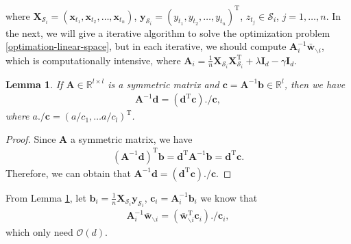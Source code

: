 \documentclass{article}
\newtheorem{lemma}{Lemma}
\begin{document}
where $\mathbf X_{\mathcal{S}_i}=(\mathbf x_{t_1},\mathbf x_{t_2},\ldots, \mathbf x_{t_n})$,
$\mathbf y_{\mathcal{S}_i}=(y_{t_1},y_{t_2},\ldots,y_{t_n})^\mathrm{T}$, $z_{t_j}\in \mathcal{S}_i$, $j=1,\ldots, n$.
In the next, we will give a iterative algorithm to
solve the optimization problem \ref{optimation-linear-space},
but in each iterative, we should compute $\mathbf A_i^{-1}\bar{\mathbf w}_{\backslash i}$, which is computationally intensive,
where $\mathbf A_i=\frac{1}{n}\mathbf X_{\mathcal{S}_i}\mathbf X_{\mathcal{S}_i}^\mathrm{T}+
\lambda \mathbf I_d-\gamma \mathbf I_d$.
\begin{lemma}
  \label{lemma-fast-linear-space}
  If $\mathbf A\in\mathbb{R}^{l\times l}$ is a symmetric matrix and $\mathbf c=\mathbf A^{-1}\mathbf b\in\mathbb{R}^l$,
  then we have
  \begin{align*}
  \mathbf A^{-1}\mathbf d=(\mathbf d^\mathrm{T}\mathbf c)./\mathbf c,
  \end{align*}
  where $a./\mathbf c=(a/c_1,\ldots a/c_l)^\mathrm{T}$.
\end{lemma}
\begin{proof}
Since $\mathbf A$ a symmetric matrix,
we have
  \begin{align*}
    \left(\mathbf A^{-1}\mathbf d\right)^\mathrm{T}\mathbf b=\mathbf d^\mathrm{T}\mathbf A^{-1}\mathbf b=\mathbf d^\mathrm{T}\mathbf c.
  \end{align*}
Therefore, we can obtain that $\mathbf A^{-1}\mathbf d=(\mathbf d^\mathrm{T}\mathbf c)./\mathbf c$.
\end{proof}
From Lemma  \ref{lemma-fast-linear-space}, let $\mathbf b_i=\frac{1}{n}\mathbf X_{\mathcal{S}_i}\mathbf y_{\mathcal{S}_i}$, $\mathbf c_i=\mathbf A_i^{-1}\mathbf b_i$ we know that
\begin{align*}
  \mathbf A_i^{-1}\bar{\mathbf w}_{\backslash i}=
  \left(\bar{\mathbf w}_{\backslash i}^\mathrm{T}\mathbf c_i\right)./\mathbf c_i,
\end{align*}
which only need $\mathcal{O}(d)$.
\end{document}
